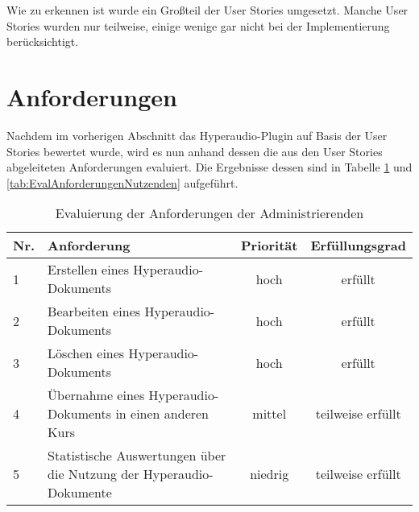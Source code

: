 Wie zu erkennen ist wurde ein Großteil der User Stories umgesetzt. Manche User Stories wurden nur teilweise, einige wenige gar nicht bei der Implementierung berücksichtigt.


\section{Anforderungen}
Nachdem im vorherigen Abschnitt das Hyperaudio-Plugin auf Basis der User Stories bewertet wurde, wird es nun anhand dessen die aus den User Stories abgeleiteten Anforderungen evaluiert. Die Ergebnisse dessen sind in Tabelle \ref{tab:EvalAnforderungenAdministrierenden} und \ref{tab:EvalAnforderungenNutzenden} aufgeführt.


\begin{table}[!ht]
\def\arraystretch{1.4}
\caption{Evaluierung der Anforderungen der Administrierenden}
\label{tab:EvalAnforderungenAdministrierenden}
 \begin{tabularx}{\textwidth}{lXcc}      
    \hline
    Nr. & Anforderung & Priorität & Erfüllungsgrad
    \\\hline
    1 & Erstellen eines Hyperaudio-Dokuments & hoch & erfüllt\\
    2 & Bearbeiten eines Hyperaudio-Dokuments & hoch & erfüllt\\
    3 & Löschen eines Hyperaudio-Dokuments & hoch & erfüllt\\
    4 & Übernahme eines Hyperaudio-Dokuments in einen anderen Kurs & mittel & teilweise erfüllt\\
    5 & Statistische Auswertungen über die Nutzung der Hyperaudio-Dokumente & niedrig & teilweise erfüllt\\
    \hline
    \end{tabularx}
\end{table}

